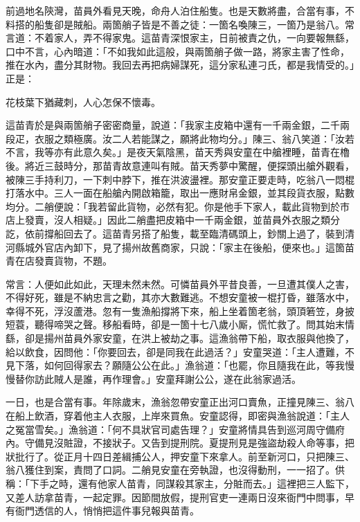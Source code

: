 前過地名陝灣，苗員外看見天晚，命舟人泊住船隻。也是天數將盡，合當有事，不料搭的船隻卻是賊船。兩箇艄子皆是不善之徒：一箇名喚陳三，一箇乃是翁八。常言道：不着家人，弄不得家鬼。這苗青深恨家主，日前被責之仇，一向要報無繇，口中不言，心內暗道：「不如我如此這般，與兩箇艄子做一路，將家主害了性命，推在水內，盡分其財物。我回去再把病婦謀死，這分家私連刁氏，都是我情受的。」正是：

\begin{myquote}
花枝葉下猶藏刺，人心怎保不懷毒。
\end{myquote}

這苗青於是與兩箇艄子密密商量，說道：「我家主皮箱中還有一千兩金銀，二千兩段疋，衣服之類極廣。汝二人若能謀之，願將此物均分。」陳三、翁八笑道：「汝若不言，我等亦有此意久矣。」是夜天氣陰黑，苗天秀與安童在中艙裡睡，苗青在櫓後。將近三鼓時分，那苗青故意連叫有賊。苗天秀夢中驚醒，便探頭出艙外觀看，被陳三手持利刀，一下刺中脖下，推在洪波盪裡。那安童正要走時，吃翁八一悶棍打落水中。三人一面在船艙內開啟箱籠，取出一應財帛金銀，並其段貨衣服，點數均分。二艄便說：「我若留此貨物，必然有犯。你是他手下家人，載此貨物到於市店上發賣，沒人相疑。」因此二艄盡把皮箱中一千兩金銀，並苗員外衣服之類分訖，依前撐船回去了。這苗青另搭了船隻，載至臨清碼頭上，鈔關上過了，裝到清河縣城外官店內卸下，見了揚州故舊商家，只說：「家主在後船，便來也。」這箇苗青在店發賣貨物，不題。

常言：人便如此如此，天理未然未然。可憐苗員外平昔良善，一旦遭其僕人之害，不得好死，雖是不納忠言之勸，其亦大數難逃。不想安童被一棍打昏，雖落水中，幸得不死，浮沒蘆港。忽有一隻漁船撐將下來，船上坐着箇老翁，頭頂箬笠，身披短蓑，聽得啼哭之聲。移船看時，卻是一箇十七八歲小厮，慌忙救了。問其始末情繇，卻是揚州苗員外家安童，在洪上被劫之事。這漁翁帶下船，取衣服與他換了，給以飲食，因問他：「你要回去，卻是同我在此過活？」安童哭道：「主人遭難，不見下落，如何回得家去？願隨公公在此。」漁翁道：「也罷，你且隨我在此，等我慢慢替你訪此賊人是誰，再作理會。」安童拜謝公公，遂在此翁家過活。

一日，也是合當有事。年除歲末，漁翁忽帶安童正出河口賣魚，正撞見陳三、翁八在船上飲酒，穿着他主人衣服，上岸來買魚。安童認得，即密與漁翁說道：「主人之冤當雪矣。」漁翁道：「何不具狀官司處告理？」安童將情具告到巡河周守備府內。守備見沒賍證，不接狀子。又告到提刑院。夏提刑見是強盜劫殺人命等事，把狀批行了。從正月十四日差緝捕公人，押安童下來拿人。前至新河口，只把陳三、翁八獲住到案，責問了口詞。二艄見安童在旁執證，也沒得動刑，一一招了。供稱：「下手之時，還有他家人苗青，同謀殺其家主，分賍而去。」這裡把三人監下，又差人訪拿苗青，一起定罪。因節間放假，提刑官吏一連兩日沒來衙門中問事，早有衙門透信的人，悄悄把這件事兒報與苗青。

